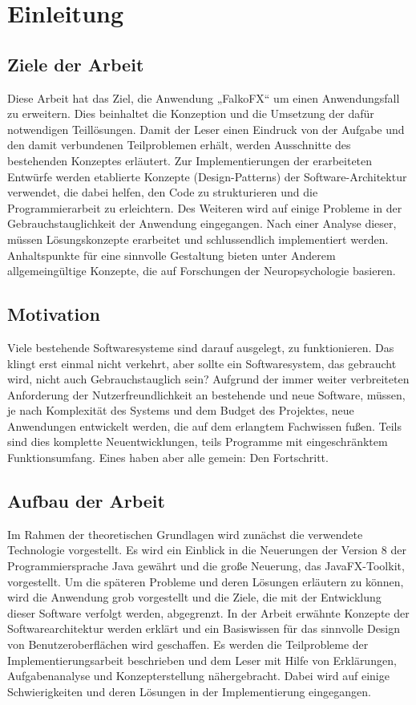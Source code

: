 \chapter{Einleitung}
\section{Ziele der Arbeit} \label{sec:einlZiel}
Diese Arbeit hat das Ziel, die Anwendung „FalkoFX“ um einen Anwendungsfall zu erweitern. Dies beinhaltet die Konzeption und die Umsetzung der dafür notwendigen Teillösungen. Damit der Leser einen Eindruck von der Aufgabe und den damit verbundenen Teilproblemen erhält, werden Ausschnitte des bestehenden Konzeptes erläutert. Zur Implementierungen der erarbeiteten Entwürfe werden etablierte Konzepte (Design-Patterns) der Software-Architektur verwendet, die dabei helfen, den Code zu strukturieren und die Programmierarbeit zu erleichtern.
Des Weiteren wird auf einige Probleme in der Gebrauchstauglichkeit der Anwendung eingegangen. Nach einer Analyse dieser, müssen Lösungskonzepte erarbeitet und schlussendlich implementiert werden. Anhaltspunkte für eine sinnvolle Gestaltung bieten unter Anderem allgemeingültige Konzepte, die auf Forschungen der Neuropsychologie basieren.

\section{Motivation} \label{sec:einlMotivation}
Viele bestehende Softwaresysteme sind darauf ausgelegt, zu funktionieren. Das klingt erst einmal nicht verkehrt, aber sollte ein Softwaresystem, das gebraucht wird, nicht auch Gebrauchstauglich sein?
Aufgrund der immer weiter verbreiteten Anforderung der Nutzerfreundlichkeit an bestehende und neue Software, müssen, je nach Komplexität des Systems und dem Budget des Projektes, neue Anwendungen entwickelt werden, die auf dem erlangtem Fachwissen fußen. Teils sind dies komplette Neuentwicklungen, teils Programme mit eingeschränktem Funktionsumfang. Eines haben aber alle 
gemein: Den Fortschritt.

\section{Aufbau der Arbeit} \label{sec:einlAufbau}
Im Rahmen der theoretischen Grundlagen wird zunächst die verwendete Technologie vorgestellt. Es wird ein Einblick in die Neuerungen der Version 8 der Programmiersprache Java gewährt und die große Neuerung, das JavaFX-Toolkit, vorgestellt.
Um die späteren Probleme und deren Lösungen erläutern zu können, wird die Anwendung grob vorgestellt und die Ziele, die mit der Entwicklung dieser Software verfolgt werden, abgegrenzt. In der Arbeit erwähnte Konzepte der Softwarearchitektur werden erklärt und ein Basiswissen für das sinnvolle Design von Benutzeroberflächen wird geschaffen.
Es werden die Teilprobleme der Implementierungsarbeit beschrieben und dem Leser mit Hilfe von Erklärungen, Aufgabenanalyse und Konzepterstellung nähergebracht. Dabei wird auf einige Schwierigkeiten und deren Lösungen in der Implementierung eingegangen.